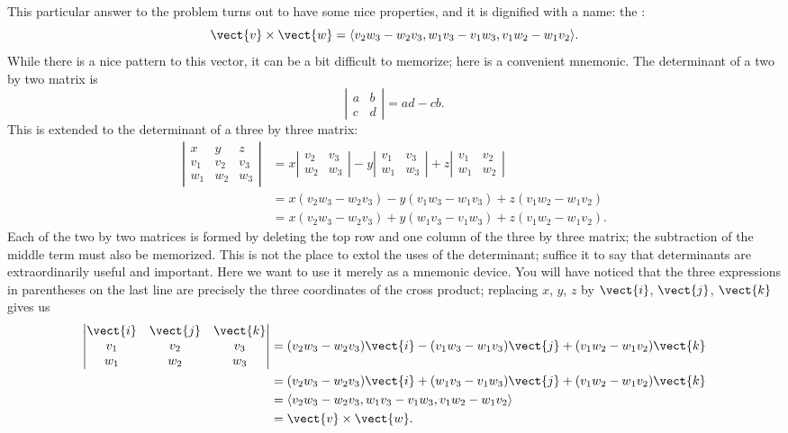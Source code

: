 This particular answer to the problem turns out to have some nice
properties, and it is dignified with a name: the 
:
$$
  \vect{v}\times\vect{w} = \langle
  v_2w_3-w_2v_3,w_1v_3-v_1w_3,v_1w_2-w_1v_2\rangle.
$$
While there is a nice pattern to this vector, it can be a bit
difficult to memorize;  here is a convenient mnemonic.
The determinant of a two by two matrix is
\[\left|
\begin{matrix}
a & b	\\
c & d
\end{matrix}
\right|=ad-cb.\]
This is extended to the determinant of a three by three matrix:
\begin{align*}
  \left|
  \begin{matrix}
  x	&	y	&	z	\\
  v_1	&	v_2	&	v_3	\\
  w_1	&	w_2	&	w_3
  \end{matrix}\right|
  &=x\left|
  \begin{matrix}
  v_2	&	v_3	\\
  w_2	&	w_3
  \end{matrix}
  \right|
  -y\left|
  \begin{matrix}
  v_1	&	v_3	\\
  w_1	&	w_3
  \end{matrix}
  \right|
  +z\left|
  \begin{matrix}
  v_1	&	v_2	\\
  w_1	&	w_2
  \end{matrix}
  \right|	\\
  &=x(v_2w_3-w_2v_3)-y(v_1w_3-w_1v_3)+z(v_1w_2-w_1v_2)	\\
  &=x(v_2w_3-w_2v_3)+y(w_1v_3-v_1w_3)+z(v_1w_2-w_1v_2).
\end{align*}
Each of the two by two matrices is formed by deleting the top row and
one column of the three by three matrix; the subtraction of the middle
term must also be memorized. This is not the place to extol the uses
of the determinant; suffice it to say that determinants are
extraordinarily useful and important. Here we want to use it merely as
a mnemonic device. You will have noticed that the three expressions in
parentheses on the last line are precisely the three coordinates of
the cross product; replacing $x$, $y$, $z$ by $\vect{i}$, $\vect{j}$, $\vect{k}$ gives us
\begin{align*}
  \left|
  \begin{matrix}
  \vect{i}	&	\vect{j}	&	\vect{k}	\\
  v_1	&	v_2	&	v_3	\\
  w_1	&	w_2	&	w_3
  \end{matrix}
  \right|
  &=(v_2w_3-w_2v_3)\vect{i}-(v_1w_3-w_1v_3)\vect{j}+(v_1w_2-w_1v_2)\vect{k}	\\
  &=(v_2w_3-w_2v_3)\vect{i}+(w_1v_3-v_1w_3)\vect{j}+(v_1w_2-w_1v_2)\vect{k}	\\
  &=\langle v_2w_3-w_2v_3,w_1v_3-v_1w_3,v_1w_2-w_1v_2\rangle	\\
  &=\vect{v}\times\vect{w}.
\end{align*}

